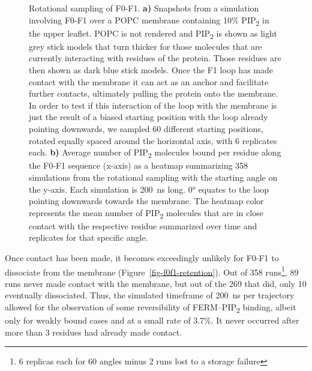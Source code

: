 \documentclass[
  twocolumn]{biophys-new-mod}
\begin{document}
\begin{figure}
\begin{minipage}[t]{\linewidth}
{{}

}

\subcaption{\label{fig-f0f1-ri-angle}~}
\end{minipage}%

\caption{\label{fig-loop-importance}Rotational sampling of F0-F1.
\textbf{a)} Snapshots from a simulation involving F0-F1 over a POPC
membrane containing 10\% PIP\textsubscript{2} in the upper leaflet. POPC
is not rendered and PIP\textsubscript{2} is shown as light grey stick
models that turn thicker for those molecules that are currently
interacting with residues of the protein. Those residues are then shown
as dark blue stick models. Once the F1 loop has made contact with the
membrane it can act as an anchor and facilitate further contacts,
ultimately pulling the protein onto the membrane. In order to test if
this interaction of the loop with the membrane is just the result of a
biased starting position with the loop already pointing downwards, we
sampled 60 different starting positions, rotated equally spaced around
the horizontal axis, with 6 replicates each. \textbf{b)} Average number
of PIP\textsubscript{2} molecules bound per residue along the F0-F1
sequence (x-axis) as a heatmap summarizing 358 simulations from the
rotational sampling with the starting angle on the y-axis. Each
simulation is 200~ns long. 0° equates to the loop pointing downwards
towards the membrane. The heatmap color represents the mean number of
PIP\textsubscript{2} molecules that are in close contact with the
respective residue summarized over time and replicates for that specific
angle.}

\end{figure}

Once contact has been made, it becomes exceedingly unlikely for F0-F1 to
dissociate from the membrane (Figure~\ref{fig-f0f1-retention}). Out of
358 runs\footnote{6 replicas each for 60 angles minus 2 runs lost to a
  storage failure}, 89 runs never made contact with the membrane, but
out of the 269 that did, only 10 eventually dissociated. Thus, the
simulated timeframe of 200~ns per trajectory allowed for the observation
of some reversibility of FERM--PIP\textsubscript{2} binding, albeit only
for weakly bound cases and at a small rate of 3.7\%. It never occurred
after more than 3 residues had already made contact.
\end{document}
